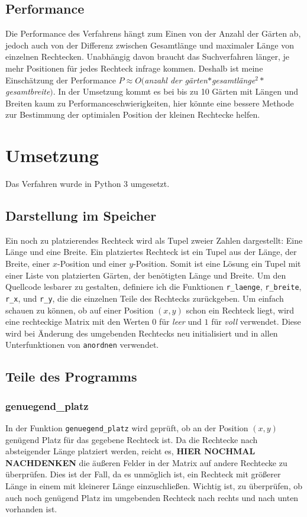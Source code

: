 \documentclass[a4paper,10pt,ngerman]{scrartcl}
\begin{document}
\subsection{Performance}
Die Performance des Verfahrens hängt zum Einen von der Anzahl der Gärten ab, jedoch auch von der Differenz zwischen Gesamtlänge und maximaler Länge von einzelnen Rechtecken. Unabhängig davon braucht das Suchverfahren länger, je mehr Positionen für jedes Rechteck infrage kommen. Deshalb ist meine Einschätzung der Performance $P \approx O($\textit{anzahl der gärten}$*$\textit{gesamtlänge}$^2*$\textit{gesamtbreite}$)$. In der Umsetzung kommt es bei bis zu 10 Gärten mit Längen und Breiten kaum zu Performanceschwierigkeiten, hier könnte eine bessere Methode zur Bestimmung der optimialen Position der kleinen Rechtecke helfen.

 
\section{Umsetzung}
Das Verfahren wurde in Python 3 umgesetzt.

\subsection{Darstellung im Speicher}
Ein noch zu platzierendes Rechteck wird als Tupel zweier Zahlen dargestellt: Eine Länge und eine Breite. Ein platziertes Rechteck ist ein Tupel aus der Länge, der Breite, einer $x$-Position und einer $y$-Position. Somit ist eine Lösung ein Tupel mit einer Liste von platzierten Gärten, der benötigten Länge und Breite. Um den Quellcode lesbarer zu gestalten, definiere ich die Funktionen \texttt{r\_laenge}, \texttt{r\_breite}, \texttt{r\_x}, und \texttt{r\_y}, die die einzelnen Teile des Rechtecks zurückgeben.
Um einfach schauen zu können, ob auf einer Position $(x,y)$ schon ein Rechteck liegt, wird eine rechteckige Matrix mit den Werten $0$ für \textit{leer} und $1$ für \textit{voll} verwendet. Diese wird bei Änderung des umgebenden Rechtecks neu initialisiert und in allen Unterfunktionen von \texttt{anordnen} verwendet.

\subsection{Teile des Programms}
\subsubsection{genuegend\_platz}
In der Funktion \texttt{genuegend\_platz} wird geprüft, ob an der Position $(x,y)$ genügend Platz für das gegebene Rechteck ist. Da die Rechtecke nach absteigender Länge platziert werden, reicht es, \textbf{HIER NOCHMAL NACHDENKEN} die äußeren Felder in der Matrix auf andere Rechtecke zu überprüfen. Dies ist der Fall, da es unmöglich ist, ein Rechteck mit größerer Länge in einem mit kleinerer Länge einzuschließen. Wichtig ist, zu überprüfen, ob auch noch genügend Platz im umgebenden Rechteck nach rechts und nach unten vorhanden ist.
\end{document}
